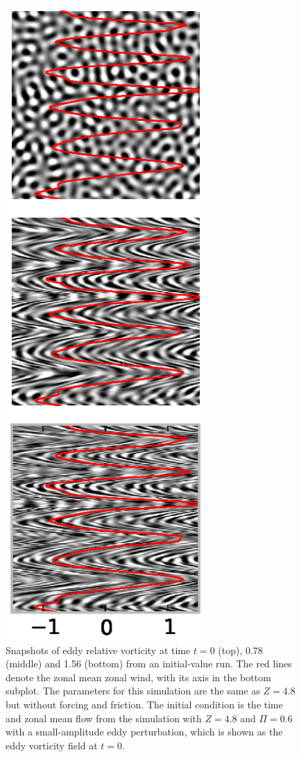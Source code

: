 \documentclass{jfm}
\begin{document}
\begin{figure}
\begin{center}
\includegraphics[width=3in]{eddy_vorticity_evolution}\caption{Snapshots of eddy relative vorticity at time $t=0$ (top), 0.78 (middle)
and 1.56 (bottom) from an initial-value run. The red lines denote
the zonal mean zonal wind, with its axis in the bottom subplot. The
parameters for this simulation are the same as $Z=4.8$ but without
forcing and friction. The initial condition is the time and zonal
mean flow from the simulation with $Z=4.8$ and $\Pi=0.6$ with a
small-amplitude eddy perturbation, which is shown as the eddy vorticity
field at $t=0$.}
\label{initial_value_run}
\end{center}
\end{figure}
\end{document}
